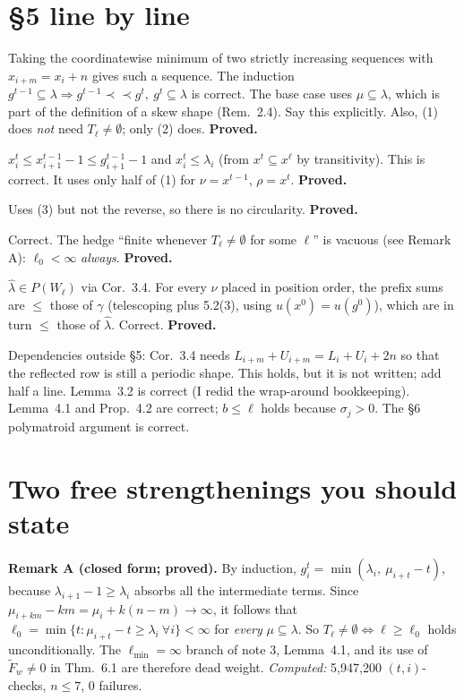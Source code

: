 \documentclass[11pt]{article}
\newcommand{\hs}{\prec\!\!\prec}
\newcommand{\lh}{\hat\lambda}
\begin{document}
\section{\S5 line by line}
\begin{description}[leftmargin=1em]
\item[Def.\ 5.1 / Lemma 5.2(1).] Taking the coordinatewise minimum of two strictly
  increasing sequences with $x_{i+m}=x_i+n$ gives such a sequence. The induction
  $g^{t-1}\subseteq\lambda \Rightarrow g^{t-1}\hs g^t,\ g^t\subseteq\lambda$ is correct.
  The base case uses $\mu\subseteq\lambda$, which is part of the definition of a skew
  shape (Rem.~2.4). Say this explicitly. Also, (1) does \emph{not} need
  $T_\ell\neq\emptyset$; only (2) does. \textbf{Proved.}
\item[Lemma 5.2(3).] $x^t_i\le x^{t-1}_{i+1}-1\le g^{t-1}_{i+1}-1$ and $x^t_i\le\lambda_i$
  (from $x^t\subseteq x^\ell$ by transitivity). This is correct. It uses only half of
  (1) for $\nu=x^{t-1}$, $\rho=x^t$. \textbf{Proved.}
\item[Lemma 5.2(2).] Uses (3) but not the reverse, so there is no circularity. \textbf{Proved.}
\item[Prop.\ 5.4.] Correct. The hedge ``finite whenever $T_\ell\ne\emptyset$ for some
  $\ell$'' is vacuous (see Remark A): $\ell_0<\infty$ \emph{always}. \textbf{Proved.}
\item[Prop.\ 5.5.] $\lh\in P(W_\ell)$ via Cor.~3.4. For every $\nu$ placed in
  position order, the prefix sums are $\le$ those of $\gamma$ (telescoping plus 5.2(3),
  using $u(x^0)=u(g^0)$), which are in turn $\le$ those of $\lh$. Correct.
  \textbf{Proved.}
\end{description}
Dependencies outside \S5: Cor.~3.4 needs $L_{i+m}+U_{i+m}=L_i+U_i+2n$ so that the
reflected row is still a periodic shape. This holds, but it is not written; add half a
line. Lemma~3.2 is correct (I redid the wrap-around bookkeeping). Lemma~4.1 and
Prop.~4.2 are correct; $b\le\ell$ holds because $\sigma_j>0$. The \S6 polymatroid
argument is correct.

\section{Two free strengthenings you should state}
\textbf{Remark A (closed form; proved).} By induction,
$g^t_i=\min(\lambda_i,\ \mu_{i+t}-t)$, because $\lambda_{i+1}-1\ge\lambda_i$ absorbs
all the intermediate terms. Since $\mu_{i+km}-km=\mu_i+k(n-m)\to\infty$, it follows that
$\ell_0=\min\{t:\mu_{i+t}-t\ge\lambda_i\ \forall i\}<\infty$ for \emph{every}
$\mu\subseteq\lambda$. So $T_\ell\neq\emptyset\iff\ell\ge\ell_0$ holds unconditionally.
The $\ell_{\min}=\infty$ branch of note 3, Lemma~4.1, and its use of
$\tilde F_w\neq0$ in Thm.~6.1 are therefore dead weight. \emph{Computed:}
5{,}947{,}200 $(t,i)$-checks, $n\le7$, 0 failures.
\end{document}
